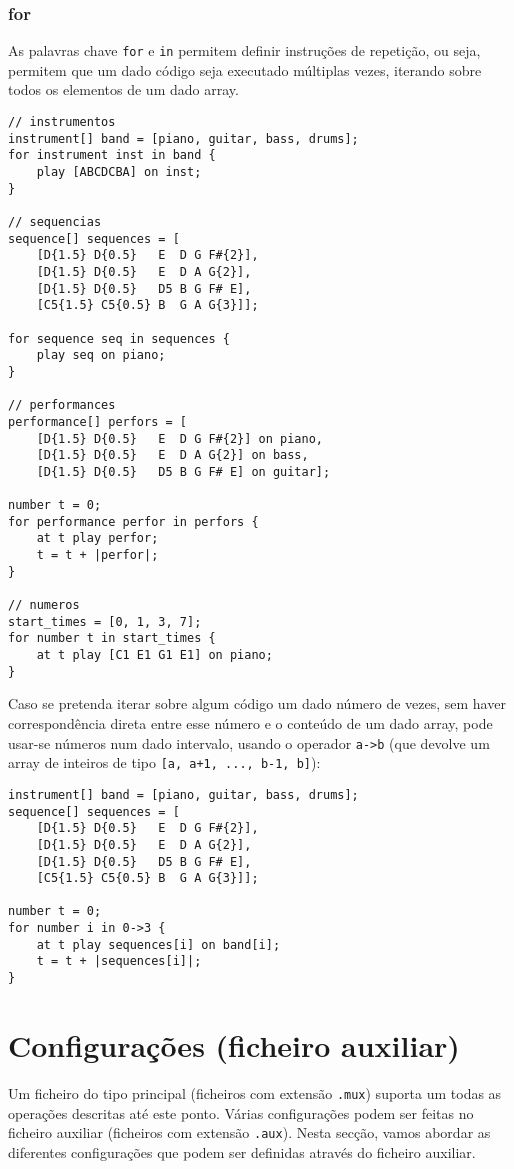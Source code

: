 \documentclass{article}
\begin{document}
\subsubsection{for}
As palavras chave \texttt{for} e \texttt{in} permitem definir instruções de repetição, ou seja, permitem que um dado código seja executado múltiplas vezes, iterando sobre todos os elementos de um dado array.
\begin{lstlisting} 
// instrumentos 
instrument[] band = [piano, guitar, bass, drums];
for instrument inst in band {
    play [ABCDCBA] on inst;
}

// sequencias
sequence[] sequences = [
    [D{1.5} D{0.5}   E  D G F#{2}], 
    [D{1.5} D{0.5}   E  D A G{2}],
    [D{1.5} D{0.5}   D5 B G F# E],
    [C5{1.5} C5{0.5} B  G A G{3}]];
    
for sequence seq in sequences {
    play seq on piano;
}
    
// performances
performance[] perfors = [
    [D{1.5} D{0.5}   E  D G F#{2}] on piano, 
    [D{1.5} D{0.5}   E  D A G{2}] on bass,
    [D{1.5} D{0.5}   D5 B G F# E] on guitar];
    
number t = 0;
for performance perfor in perfors {
    at t play perfor;
    t = t + |perfor|;
}

// numeros
start_times = [0, 1, 3, 7];
for number t in start_times {
    at t play [C1 E1 G1 E1] on piano;
}
\end{lstlisting}

Caso se pretenda iterar sobre algum código um dado número de vezes, sem haver correspondência direta entre esse número e o conteúdo de um dado array, pode usar-se números num dado intervalo, usando o operador \texttt{a->b} (que devolve um array de inteiros de tipo \texttt{[a, a+1, ..., b-1, b]}):
\begin{lstlisting} 
instrument[] band = [piano, guitar, bass, drums];
sequence[] sequences = [
    [D{1.5} D{0.5}   E  D G F#{2}], 
    [D{1.5} D{0.5}   E  D A G{2}],
    [D{1.5} D{0.5}   D5 B G F# E],
    [C5{1.5} C5{0.5} B  G A G{3}]];

number t = 0;
for number i in 0->3 {
    at t play sequences[i] on band[i];
    t = t + |sequences[i]|;
}
\end{lstlisting}

\section{Configurações (ficheiro auxiliar)} \label{config}
Um ficheiro do tipo principal (ficheiros com extensão \texttt{.mux}) suporta um todas as operações descritas até este ponto. 
Várias configurações podem ser feitas no ficheiro auxiliar (ficheiros com extensão \texttt{.aux}). Nesta secção, vamos abordar as diferentes configurações que podem ser definidas através do ficheiro auxiliar.
\end{document}
